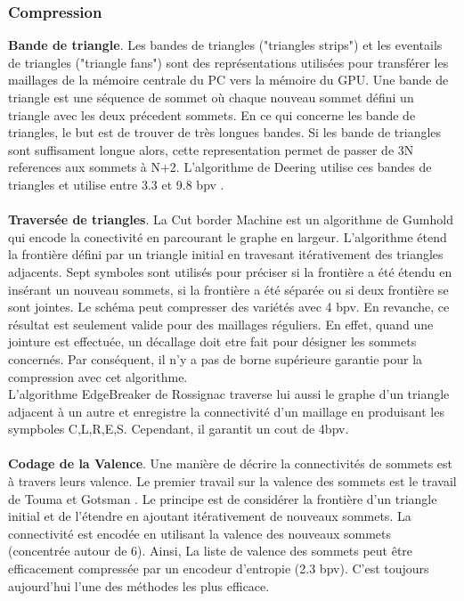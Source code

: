 \subsubsection{Compression}
\noindent
\textbf{Bande de triangle}. Les bandes de triangles ("triangles strips") et les eventails de triangles ("triangle fans") sont des représentations utilisées pour transférer les maillages de la mémoire centrale du PC vers la mémoire du GPU. Une bande de triangle est une séquence de sommet où chaque nouveau sommet défini un triangle avec les deux précedent sommets. En ce qui concerne les bande de triangles, le but est de trouver de très longues bandes. Si les bande de triangles sont suffisament longue alors, cette representation permet de passer de 3N references aux sommets à N+2. L'algorithme de Deering utilise ces bandes de triangles et utilise entre 3.3 et 9.8 bpv \cite{triangle_strips}.\\\\
\textbf{Traversée de triangles}. La Cut border Machine \cite{cut_border_machine_2d} est un algorithme de Gumhold qui encode la conectivité en parcourant le graphe en largeur. L'algorithme étend la frontière défini par un triangle initial en travesant itérativement des triangles adjacents. Sept symboles sont utilisés pour préciser si la frontière a été étendu en insérant un nouveau sommets, si la frontière a été séparée ou si deux frontière se sont jointes. Le schéma peut compresser des variétés avec 4 bpv. En revanche, ce résultat est seulement valide pour des maillages réguliers. En effet, quand une jointure est effectuée, un décallage doit etre fait pour désigner les sommets concernés. Par conséquent, il n'y a pas de borne supérieure garantie pour la compression avec cet algorithme.\\
L'algorithme EdgeBreaker de Rossignac \cite{edgebreaker} traverse lui aussi le graphe d'un triangle adjacent à un autre et enregistre la connectivité d'un maillage en produisant les sympboles C,L,R,E,S. Cependant, il garantit un cout de 4bpv.\\\\
\textbf{Codage de la Valence}. Une manière de décrire la connectivités de sommets est à travers leurs valence. Le premier travail sur la valence des sommets est le travail de Touma et Gotsman \cite{valence_encoding}. Le principe est de considérer la frontière d'un triangle initial et de l'étendre en ajoutant itérativement de nouveaux sommets. La connectivité est encodée en utilisant la valence des nouveaux sommets (concentrée autour de 6). Ainsi, La liste de valence des sommets peut être efficacement compressée par un encodeur d'entropie (2.3 bpv). C'est toujours aujourd'hui l'une des méthodes les plus efficace.
